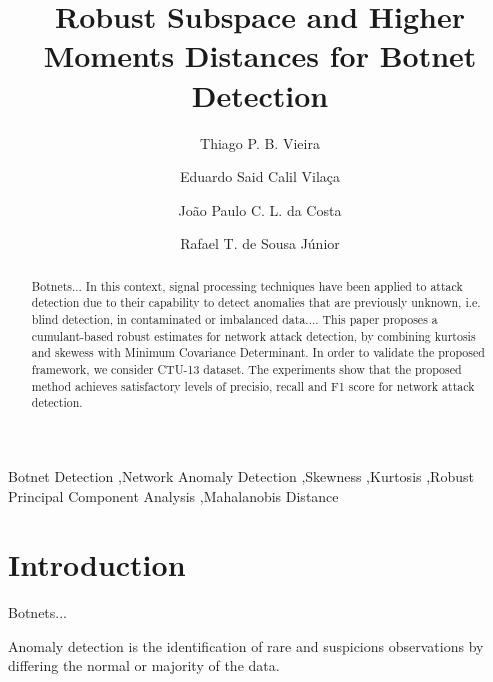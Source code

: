 \documentclass[review]{elsarticle}
\begin{document}
\begin{frontmatter}

\title{Robust Subspace and Higher Moments Distances for Botnet Detection}

\author[unbaddress]{Thiago P. B. Vieira}
\author[unbaddress]{Eduardo Said Calil Vilaça}
\author[unbaddress,Ilmenauaddress,Fraunhoferaddress]{João Paulo C. L. da Costa}
\author[unbaddress]{Rafael T. de Sousa Júnior}

\address[unbaddress]{Department of Electrical Engineering, University of Brasilia (UnB), 70910-900, Brasília-DF, Brazil}
\address[Ilmenauaddress]{Institute for Information Technology, Ilmenau University of Technology, Ilmenau, Germany}
\address[Fraunhoferaddress]{Fraunhofer Institute for Integrated Circuits IIS, Erlangen, Germany}


\begin{abstract}
Botnets... In this context, signal processing techniques have been applied to attack detection due to their capability to detect anomalies that are previously unknown, i.e. blind detection, in contaminated or imbalanced data.... This paper proposes a cumulant-based robust estimates for network attack detection, by combining kurtosis and skewess with Minimum Covariance Determinant. In order to validate the proposed framework, we consider CTU-13 dataset. The experiments show that the proposed method achieves satisfactory levels of precisio, recall and F1 score for network attack detection.
\end{abstract}

\begin{keyword}
Botnet Detection \sep Network Anomaly Detection \sep Skewness \sep Kurtosis \sep Robust Principal Component Analysis \sep Mahalanobis Distance
\end{keyword}

\end{frontmatter}

\linenumbers

\section{Introduction}
\label{sec:introduction}

Botnets...

Anomaly detection is the identification of rare and suspicions observations by differing the normal or majority of the data.
\end{document}
